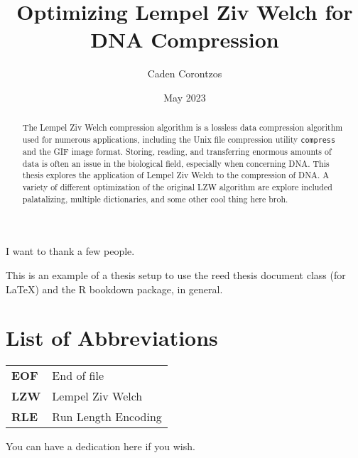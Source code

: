 \documentclass[12pt,twoside]{reedthesis}
\title{Optimizing Lempel Ziv Welch for DNA Compression}
\author{Caden Corontzos}
\date{May 2023}
\begin{document}
  \maketitle

\frontmatter %
\pagestyle{empty} %
  \begin{acknowledgements}
    I want to thank a few people.
  \end{acknowledgements}
  \begin{preface}
    This is an example of a thesis setup to use the reed thesis document class
    (for LaTeX) and the R bookdown package, in general.
  \end{preface}
\chapter*{List of Abbreviations}
\begin{table}[h]
    \centering
    \begin{tabular}{ll}
                \textbf{EOF} & End of file \\
                \textbf{LZW} & Lempel Ziv Welch \\
                \textbf{RLE} & Run Length Encoding \\
            \end{tabular}
\end{table}
  \hypersetup{linkcolor=black}
  \setcounter{secnumdepth}{2}
  \setcounter{tocdepth}{2}
  \tableofcontents

  \listoftables

  \listoffigures
  \begin{abstract}
    The Lempel Ziv Welch compression algorithm is a lossless data compression algorithm used for numerous applications, including the Unix file compression utility \texttt{compress} and the GIF image format. Storing, reading, and transferring enormous amounts of data is often an issue in the biological field, especially when concerning DNA. This thesis explores the application of Lempel Ziv Welch to the compression of DNA. A variety of different optimization of the original LZW algorithm are explore included palatalizing, multiple dictionaries, and some other cool thing here broh.
  \end{abstract}
  \begin{dedication}
    You can have a dedication here if you wish.
  \end{dedication}
\mainmatter %
\pagestyle{fancyplain} %
\end{document}
